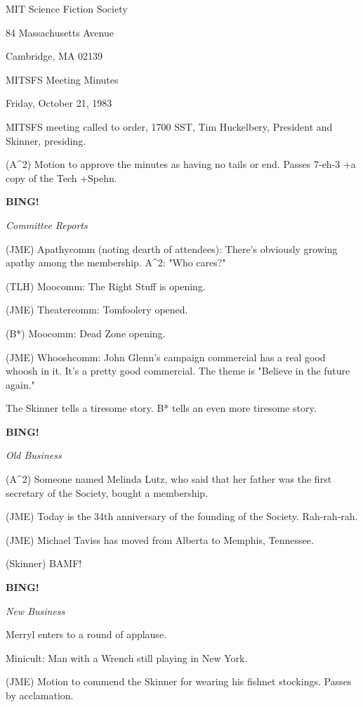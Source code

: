 \documentclass[12pt]{article}
\newcommand{\bing}{{\bf BING!} }
\newcommand{\goto}[1]{\bing \vskip 12pt \centerline{{\em{#1}}}}
\begin{document}
\begin{center}

MIT Science Fiction Society 

84 Massachusetts Avenue

Cambridge, MA 02139

\vspace{12pt}

MITSFS Meeting Minutes 

Friday, October 21, 1983

\end{center}
 
\vspace{18pt}

\setlength{\parskip}{6pt}

\noindent
MITSFS meeting called to order, 1700 SST,
Tim Huckelbery, President and Skinner, presiding.

(A^2) Motion to approve the minutes as having no tails or end. Passes 7-eh-3 +a copy of the Tech +Spehn.

\goto{Committee Reports}

(JME) Apathycomm (noting dearth of attendees): There's obviously growing apathy among the membership. A^2: "Who cares?"

(TLH) Moocomm: The Right Stuff is opening.

(JME) Theatercomm: Tomfoolery opened.

(B*) Moocomm: Dead Zone opening.

(JME) Whooshcomm: John Glenn's campaign commercial has a real good whoosh in it. It's a pretty good commercial. The theme is "Believe in the future again."

The Skinner tells a tiresome story. B* tells an even more tiresome story.

\goto{Old Business}

(A^2) Someone named Melinda Lutz, who said that her father was the first secretary of the Society, bought a membership.

(JME) Today is the 34th anniversary of the founding of the Society. Rah-rah-rah.

(JME) Michael Taviss has moved from Alberta to Memphis, Tennessee.

(Skinner) BAMF!

\goto{New Business}

Merryl enters to a round of applause.

Minicult: Man with a Wrench still playing in New York.

(JME) Motion to commend the Skinner for wearing his fishnet stockings. Passes by acclamation.
\end{document}
